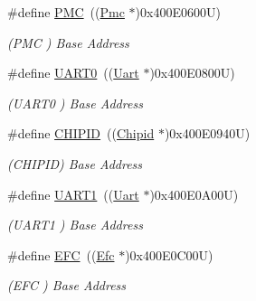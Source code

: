 \begin{DoxyCompactItemize}
\mbox{\label{group__SAME70J19__base_ga979c6d379c67bc2f3e8eb6efcb509f69}} 
\#define \mbox{\hyperlink{group__SAME70J19__base_ga979c6d379c67bc2f3e8eb6efcb509f69}{P\+MC}}~((\mbox{\hyperlink{structPmc}{Pmc}}    $\ast$)0x400\+E0600\+U)
\begin{DoxyCompactList}\small\item\em (P\+MC ) Base Address \end{DoxyCompactList}\item 
\mbox{\label{group__SAME70J19__base_ga0508661f121639ffdee7de2353a0def2}} 
\#define \mbox{\hyperlink{group__SAME70J19__base_ga0508661f121639ffdee7de2353a0def2}{U\+A\+R\+T0}}~((\mbox{\hyperlink{structUart}{Uart}}   $\ast$)0x400\+E0800\+U)
\begin{DoxyCompactList}\small\item\em (U\+A\+R\+T0 ) Base Address \end{DoxyCompactList}\item 
\mbox{\label{group__SAME70J19__base_gaad94298a355e512569f4c8e9bc7d094f}} 
\#define \mbox{\hyperlink{group__SAME70J19__base_gaad94298a355e512569f4c8e9bc7d094f}{C\+H\+I\+P\+ID}}~((\mbox{\hyperlink{structChipid}{Chipid}} $\ast$)0x400\+E0940\+U)
\begin{DoxyCompactList}\small\item\em (C\+H\+I\+P\+ID) Base Address \end{DoxyCompactList}\item 
\mbox{\label{group__SAME70J19__base_ga8d69bf04d07af4fbbab5a8bd291f65ff}} 
\#define \mbox{\hyperlink{group__SAME70J19__base_ga8d69bf04d07af4fbbab5a8bd291f65ff}{U\+A\+R\+T1}}~((\mbox{\hyperlink{structUart}{Uart}}   $\ast$)0x400\+E0\+A00\+U)
\begin{DoxyCompactList}\small\item\em (U\+A\+R\+T1 ) Base Address \end{DoxyCompactList}\item 
\mbox{\label{group__SAME70J19__base_gaeec4966f059f5b363188e2629ce94ac2}} 
\#define \mbox{\hyperlink{group__SAME70J19__base_gaeec4966f059f5b363188e2629ce94ac2}{E\+FC}}~((\mbox{\hyperlink{structEfc}{Efc}}    $\ast$)0x400\+E0\+C00\+U)
\begin{DoxyCompactList}\small\item\em (E\+FC ) Base Address \end{DoxyCompactList}\item 

\end{DoxyCompactItemize}
